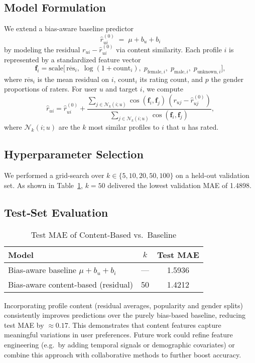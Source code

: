 \subsection*{Model Formulation}
We extend a bias-aware baseline predictor 
\[
  \hat r_{ui}^{(0)} \;=\; \mu + b_u + b_i
\]
by modeling the residual \(r_{ui} - \hat r_{ui}^{(0)}\) via content similarity.  Each profile \(i\) is represented by a standardized feature vector 
\[
  \mathbf{f}_i = \mathrm{scale}\bigl[\,
    \overline{\mathrm{res}}_i,\;
    \log(1 + \mathrm{count}_i),\;
    p_{\mathrm{female},i},\;
    p_{\mathrm{male},i},\;
    p_{\mathrm{unknown},i}
  \bigr],
\]
where \(\overline{\mathrm{res}}_i\) is the mean residual on \(i\), \(\mathrm{count}_i\) its rating count, and \(p\) the gender proportions of raters.  For user \(u\) and target \(i\), we compute
\[
  \hat r_{ui}
  = \hat r_{ui}^{(0)}
  + \frac{\sum_{j\in\mathcal N_k(i;u)} 
               \cos(\mathbf f_i,\mathbf f_j)\,(r_{uj} - \hat r_{uj}^{(0)})}
         {\sum_{j\in\mathcal N_k(i;u)} \cos(\mathbf f_i,\mathbf f_j)},
\]
where \(\mathcal N_k(i;u)\) are the \(k\) most similar profiles to \(i\) that \(u\) has rated.

\subsection*{Hyperparameter Selection}
We performed a grid-search over \(k\in\{5,10,20,50,100\}\) on a held-out validation set.  As shown in Table~\ref{tab:cbf}, \(k=50\) delivered the lowest validation MAE of 1.4898.

\subsection*{Test‐Set Evaluation}
\begin{table}[H]
  \centering
  \caption{Test MAE of Content-Based vs.\ Baseline}
  \label{tab:cbf}
  \begin{tabular}{@{}lcc@{}}
    \toprule
    Model                            & \(k\) & Test MAE \\ 
    \midrule
    Bias-aware baseline \(\mu+b_u+b_i\)     & —     & 1.5936   \\
    Bias-aware content-based (residual)     & 50    & 1.4212   \\
    
    \bottomrule
  \end{tabular}
\end{table}

Incorporating profile content (residual averages, popularity and gender splits) consistently improves predictions over the purely bias-based baseline, reducing test MAE by \(\approx\!0.17\).  This demonstrates that content features capture meaningful variations in user preferences.  Future work could refine feature engineering (e.g.\ by adding temporal signals or demographic covariates) or combine this approach with collaborative methods to further boost accuracy.